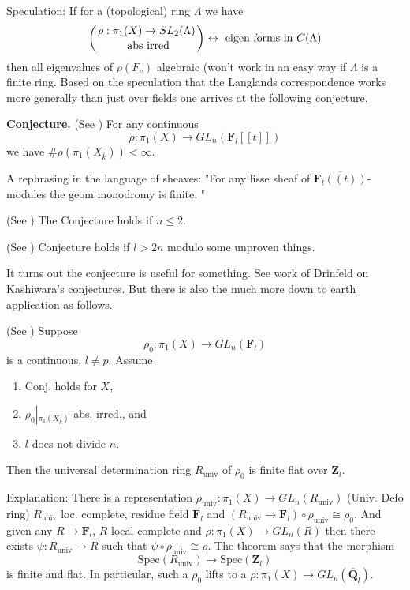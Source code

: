 \noindent
Speculation: If for a (topological) ring $\Lambda$ we have 
$$
\left(
{\rho: \pi_1(X)\to SL_2(\Lambda)\atop \text{ abs irred}}
\right)
\leftrightarrow
\text{ eigen forms in } C(\Lambda)
$$
then all eigenvalues of $\rho(F_v)$ algebraic (won't work in an easy
way if $\Lambda$ is a finite ring. Based on the speculation that the
Langlands correspondence works more generally than just over fields
one arrives at the following conjecture.
	
\medskip\noindent
{\bf Conjecture.}
(See \cite{dJ-conjecture})
For any continuous
$$
\rho: \pi_1(X)\to GL_n(\mathbf{F}_l[[t]])
$$
we have $\# \rho(\pi_1(X_{\overline k}))<\infty$. 

\medskip\noindent
A rephrasing in the language of sheaves:
"For any lisse sheaf of $\overline{\mathbf{F}_l((t))}$-modules the geom 
monodromy is finite. "
	
\begin{theorem}
\label{theorem-conjecture-n-2}
(See \cite{dJ-conjecture}) The Conjecture holds if $n\leq 2$. 
\end{theorem}

\begin{theorem}
\label{theorem-conjecture-l-bigger-2n}
(See \cite{Gaitsgory})
Conjecture holds if $l>2n$ modulo some unproven things. 
\end{theorem}

\noindent
It turns out the conjecture is useful for something.
See work of Drinfeld on Kashiwara's conjectures. But there is also
the much more down to earth application as follows.

\begin{theorem}
\label{theorem-deformation-rings}
(See \cite[Theorem 3.5]{dJ-conjecture})
Suppose
$$
\rho_0: \pi_1(X)\to GL_n(\mathbf{F}_l)
$$
is a continuous, $l\neq p$. Assume
\begin{enumerate}
\item Conj. holds for $X$,
\item $\rho_0\left|_{\pi_1(X_{\overline k})}\right.$ abs. irred., and
\item $l$ does not divide $n$.
\end{enumerate}
Then the universal determination ring $R_{\text{univ}}$ of $\rho_0$ is 
finite flat over $\mathbf{Z}_l$. 
\end{theorem}

\noindent
Explanation: There is a representation $\rho_{\text{univ}}: 
\pi_1(X)\to GL_n(R_{\text{univ}})$ (Univ. Defo ring) $R_{\text{univ}}$ loc. 
complete, residue field $\mathbf{F}_l$ and $(R_{\text{univ}}\to 
\mathbf{F}_l)\circ\rho_{\text{univ}}\cong\rho_0$.
And given any $R\to \mathbf{F}_l$, $R$ local complete and $\rho: \pi_1(X)\to 
GL_n(R)$ then there exists $\psi: R_{\text{univ}}\to R$ such that 
$\psi\circ\rho_{\text{univ}}\cong \rho$. The theorem says that the morphism
$$
\text{Spec}(R_{\text{univ}})
\longrightarrow
\text{Spec}(\mathbf{Z}_l)
$$
is finite and flat. In particular, such a $\rho_0$
lifts to a $\rho: \pi_1(X)\to GL_n(\overline{\mathbf{Q}}_l)$.

